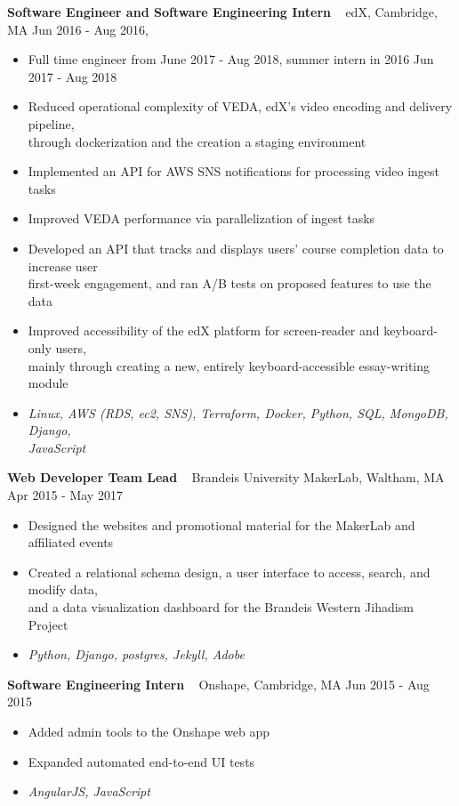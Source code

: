 \documentclass{res}
\begin{document}
\begin{resume}
\textbf{Software Engineer and Software Engineering Intern} ~ edX, Cambridge, MA \hfill Jun 2016 - Aug 2016, \\ 
	\begin{itemize}  \itemsep -2pt %
	\item Full time engineer from June 2017 - Aug 2018, summer intern in 2016 \hfill Jun 2017 - Aug 2018
	\item Reduced operational complexity of VEDA, edX's video encoding and delivery pipeline, \\
		through dockerization and the creation a staging environment
	\item Implemented an API for AWS SNS notifications for processing video ingest tasks
	\item Improved VEDA performance via parallelization of ingest tasks
	\item Developed an API that tracks and displays users' course completion data to increase user \\
		first-week engagement, and ran A/B tests on proposed features to use the data 
	\item Improved accessibility of the edX platform for screen-reader and keyboard-only users, \\
		mainly through creating a new, entirely keyboard-accessible essay-writing module
	\item {\sl Linux, AWS (RDS, ec2, SNS), Terraform, Docker, Python, SQL, MongoDB, Django, \\ 
		JavaScript}
	\end{itemize}

\textbf{Web Developer Team Lead} ~ Brandeis University MakerLab, Waltham, MA  \hfill Apr 2015 - May 2017 \\
	\begin{itemize}  \itemsep -2pt %
	\item Designed the websites and promotional material for the MakerLab and affiliated events
	\item Created a relational schema design, a user interface to access, search, and modify data,  \\
	and a data visualization dashboard for the Brandeis Western Jihadism Project
	\item {\sl Python, Django, postgres, Jekyll, Adobe}
	\end{itemize}
		
\textbf{Software Engineering Intern} ~ Onshape, Cambridge, MA \hfill Jun 2015 - Aug 2015 \\ 
	\begin{itemize}  \itemsep -2pt %
	\item Added admin tools to the Onshape web app
	\item Expanded automated end-to-end UI tests
	\item {\sl AngularJS, JavaScript}
	\end{itemize}
	

\end{resume}
\end{document}
